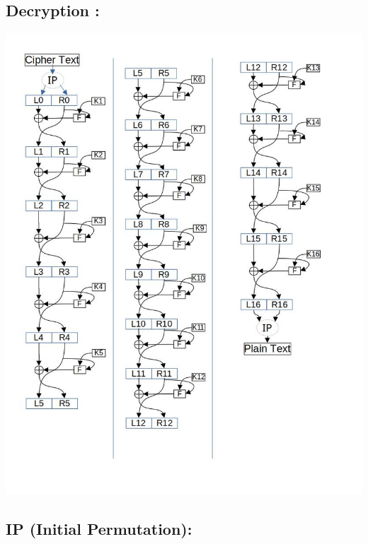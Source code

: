 \documentclass[11pt]{article}
\begin{document}
\subsection{Decryption :}
\includegraphics[scale=0.8]{Images/L_5-6/DES Structure-Dec.jpg}
\newpage
\subsection{IP (Initial Permutation):}
\end{document}
